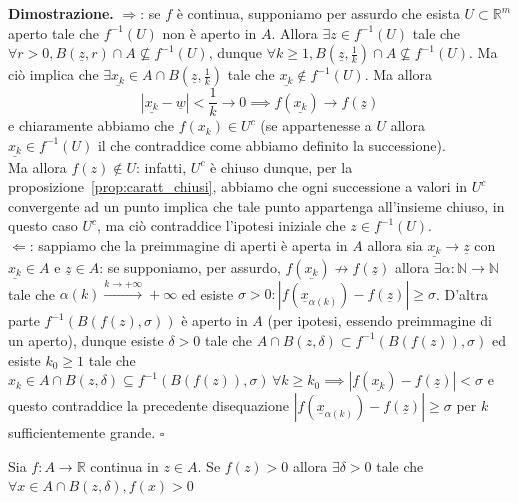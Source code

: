 \noindent \textbf{Dimostrazione. } 
$\boxed{\Rightarrow}$: se $f$ è continua, supponiamo per assurdo che esista $U \subset \mathbb{R}^m$ aperto tale che $f^{-1}(U)$ non è aperto in $A$. Allora $\exists z \in f^{-1}(U)$ tale che $\forall r > 0, B(\underline{z}, r) \cap A \not\subseteq f^{-1}(U)$, dunque $\forall k \geq 1, B(\underline{z}, \frac{1}{k}) \cap A \not\subseteq f^{-1}(U)$. Ma ciò implica che $\exists \underline{x_k} \in A \cap B(\underline{z}, \frac{1}{k})$ tale che $\underline{x_k} \not\in f^{-1}(U)$. Ma allora 
$$
|\underline{x_k} - \underline{w}| < \frac{1}{k} \to 0 \implies f(\underline{x_k}) \to f(\underline{z})
$$
e chiaramente abbiamo che $f(x_k) \in U^c$ (se appartenesse a $U$ allora $\underline{x_k} \in f^{-1}(U)$ il che contraddice come abbiamo definito la successione). \\ Ma allora $f(z) \not\in U$: infatti, $U^c$ è chiuso dunque, per la proposizione~\ref{prop:caratt_chiusi}, abbiamo che ogni successione a valori in $U^c$ convergente ad un punto implica che tale punto appartenga all'insieme chiuso, in questo caso $U^c$, ma ciò contraddice l'ipotesi iniziale che $z \in f^{-1}(U)$. \\
$\boxed{\Leftarrow}$: sappiamo che la preimmagine di aperti è aperta in $A$ allora sia $\underline{x_k} \to \underline{z}$ con $\underline{x_k} \in A$ e $\underline{z} \in A$: se supponiamo, per assurdo, $f(\underline{x_k}) \not\to f(\underline{z})$ allora $\exists \alpha: \mathbb{N} \to \mathbb{N}$ tale che $\alpha(k) \stackrel{k \to +\infty}{\to} +\infty$ ed esiste $\sigma > 0: |f(\underline{x}_{\alpha(k)}) - f(\underline{z})| \geq \sigma$. D'altra parte $f^{-1}(B(f(z), \sigma))$ è aperto in $A$ (per ipotesi, essendo preimmagine di un aperto), dunque esiste $\delta > 0$ tale che $A \cap B(z, \delta) \subset f^{-1}(B(f(z)), \sigma)$ ed esiste $k_0 \geq 1$ tale che $x_k \in A \cap B(z, \delta) \subseteq f^{-1}(B(f(z)), \sigma) \, \forall k \geq k_0 \implies |f(\underline{x_k}) - f(\underline{z})| < \sigma$ e questo contraddice la precedente disequazione $|f(\underline{x}_{\alpha(k)})-f(\underline{z})| \geq \sigma$ per $k$ sufficientemente grande.
\hfill $\square$

\vspace{0.5cm}
\begin{theorem}[\textcolor{blue}{della permanenza del segno}]
Sia $f: A \to \mathbb{R}$ continua in $z \in A$. Se $f(z) > 0$ allora $\exists \delta > 0$ tale che $\forall x \in A \cap B(z, \delta), f(x) > 0$
\end{theorem}


